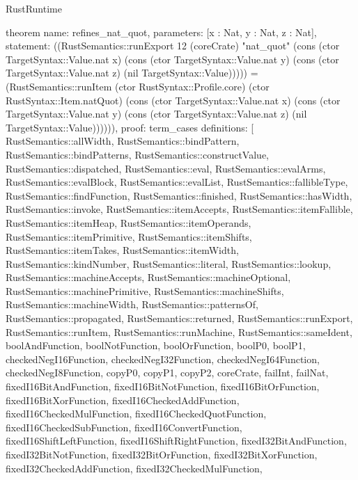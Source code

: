 \begin{lexlean}{RustRuntime}
\begin{semanticmodule}
theorem{
  name: refines_nat_quot,
  parameters: [x : Nat, y : Nat, z : Nat],
  statement: ((RustSemantics::runExport 12 (coreCrate) "nat_quot" (cons (ctor TargetSyntax::Value.nat x) (cons (ctor TargetSyntax::Value.nat y) (cons (ctor TargetSyntax::Value.nat z) (nil TargetSyntax::Value))))) = (RustSemantics::runItem (ctor RustSyntax::Profile.core) (ctor RustSyntax::Item.natQuot) (cons (ctor TargetSyntax::Value.nat x) (cons (ctor TargetSyntax::Value.nat y) (cons (ctor TargetSyntax::Value.nat z) (nil TargetSyntax::Value)))))),
  proof: term_cases{
    definitions: [
      RustSemantics::allWidth,
      RustSemantics::bindPattern,
      RustSemantics::bindPatterns,
      RustSemantics::constructValue,
      RustSemantics::dispatched,
      RustSemantics::eval,
      RustSemantics::evalArms,
      RustSemantics::evalBlock,
      RustSemantics::evalList,
      RustSemantics::fallibleType,
      RustSemantics::findFunction,
      RustSemantics::finished,
      RustSemantics::hasWidth,
      RustSemantics::invoke,
      RustSemantics::itemAccepts,
      RustSemantics::itemFallible,
      RustSemantics::itemHeap,
      RustSemantics::itemOperands,
      RustSemantics::itemPrimitive,
      RustSemantics::itemShifts,
      RustSemantics::itemTakes,
      RustSemantics::itemWidth,
      RustSemantics::kindNumber,
      RustSemantics::literal,
      RustSemantics::lookup,
      RustSemantics::machineAccepts,
      RustSemantics::machineOptional,
      RustSemantics::machinePrimitive,
      RustSemantics::machineShifts,
      RustSemantics::machineWidth,
      RustSemantics::patternsOf,
      RustSemantics::propagated,
      RustSemantics::returned,
      RustSemantics::runExport,
      RustSemantics::runItem,
      RustSemantics::runMachine,
      RustSemantics::sameIdent,
      boolAndFunction,
      boolNotFunction,
      boolOrFunction,
      boolP0,
      boolP1,
      checkedNegI16Function,
      checkedNegI32Function,
      checkedNegI64Function,
      checkedNegI8Function,
      copyP0,
      copyP1,
      copyP2,
      coreCrate,
      failInt,
      failNat,
      fixedI16BitAndFunction,
      fixedI16BitNotFunction,
      fixedI16BitOrFunction,
      fixedI16BitXorFunction,
      fixedI16CheckedAddFunction,
      fixedI16CheckedMulFunction,
      fixedI16CheckedQuotFunction,
      fixedI16CheckedSubFunction,
      fixedI16ConvertFunction,
      fixedI16ShiftLeftFunction,
      fixedI16ShiftRightFunction,
      fixedI32BitAndFunction,
      fixedI32BitNotFunction,
      fixedI32BitOrFunction,
      fixedI32BitXorFunction,
      fixedI32CheckedAddFunction,
      fixedI32CheckedMulFunction,
}}
\end{semanticmodule}
\end{lexlean}
